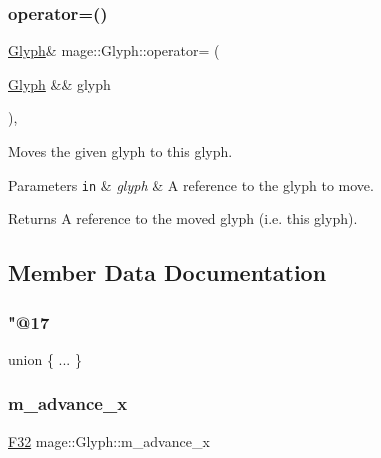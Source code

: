 \subsubsection{\texorpdfstring{operator=()}{operator=()}\hspace{0.1cm}{\footnotesize\ttfamily [2/2]}}
{\footnotesize\ttfamily \hyperlink{structmage_1_1_glyph}{Glyph}\& mage\+::\+Glyph\+::operator= (\begin{DoxyParamCaption}\item[{\hyperlink{structmage_1_1_glyph}{Glyph} \&\&}]{glyph }\end{DoxyParamCaption})\hspace{0.3cm}{\ttfamily [default]}, {\ttfamily [noexcept]}}

Moves the given glyph to this glyph.


\begin{DoxyParams}[1]{Parameters}
\mbox{\tt in}  & {\em glyph} & A reference to the glyph to move. \\
\hline
\end{DoxyParams}
\begin{DoxyReturn}{Returns}
A reference to the moved glyph (i.\+e. this glyph). 
\end{DoxyReturn}


\subsection{Member Data Documentation}
\hypertarget{structmage_1_1_glyph_a64804f892a7565cbd1f9900802b866fc}{}\label{structmage_1_1_glyph_a64804f892a7565cbd1f9900802b866fc} 
\subsubsection{\texorpdfstring{"@17}{@17}}
{\footnotesize\ttfamily union \{ ... \} }

\hypertarget{structmage_1_1_glyph_ac0905a82d2f5adefb7930359a0b3cef8}{}\label{structmage_1_1_glyph_ac0905a82d2f5adefb7930359a0b3cef8} 
\subsubsection{\texorpdfstring{m\+\_\+advance\+\_\+x}{m\_advance\_x}}
{\footnotesize\ttfamily \hyperlink{namespacemage_aa97e833b45f06d60a0a9c4fc22ae02c0}{F32} mage\+::\+Glyph\+::m\+\_\+advance\+\_\+x}

